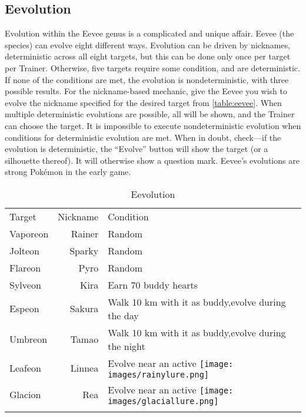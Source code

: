 \subsection{Eevolution}
\begin{figure}
\end{figure}
Evolution within the Eevee genus is a complicated and unique affair.
Eevee (the species) can evolve eight different ways.
Evolution can be driven by nicknames, deterministic across all eight targets,
  but this can be done only once per target per Trainer.
Otherwise, five targets require some condition, and are deterministic.
If none of the conditions are met, the evolution is nondeterministic,
  with three possible results.
For the nickname-based mechanic, give the Eevee you wish to evolve the nickname
  specified for the desired target from \autoref{table:eevee}.
When multiple deterministic evolutions are possible, all will be shown,
  and the Trainer can choose the target.
It is impossible to execute nondeterministic evolution when conditions for deterministic evolution are met.
When in doubt, check---if the evolution is deterministic, the ``Evolve'' button will show the target (or a silhouette thereof).
It will otherwise show a question mark.
Eevee's evolutions are strong Pokémon in the early game.
\begin{table}
\centering
\begin{tabular}{lrp{}}
  Target & Nickname & Condition\\
  \Midrule
  Vaporeon & Rainer & Random\\
  Jolteon & Sparky & Random\\
  Flareon & Pyro & Random\\
  Sylveon & Kira & Earn 70 buddy hearts \\
  Espeon & Sakura & Walk 10 km with it as buddy,\newline evolve during the day\\
  Umbreon & Tamao & Walk 10 km with it as buddy,\newline evolve during the night\\
  Leafeon & Linnea & Evolve near an active \texttt{[image: images/rainylure.png]} \\
  Glacion & Rea & Evolve near an active \texttt{[image: images/glaciallure.png]} \\\\
\end{tabular}
  \caption{Eevolution\label{table:eevee}}
\end{table}

